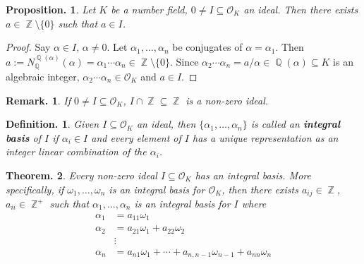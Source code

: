 \documentclass[11pt, a4paper]{memoir}
\DeclareMathOperator{\Q}{{\mathbb{Q}}}
\DeclareMathOperator{\Z}{{\mathbb{Z}}}
\theoremstyle{change}
\newtheorem{theorem}{Theorem.}[section]
\newtheorem{proposition}[theorem]{Proposition.}
\theoremstyle{plain}
\theoremstyle{nonumberplain}
\newtheorem{definition}{Definition.}
\newtheorem{remark}{Remark.}
\newtheorem{proof}{Proof}
\numberwithin{equation}{section}
\begin{document}
\begin{proposition}
    Let $K$ be a number field, $0\neq I\subseteq\mathcal{O}_K$ an ideal.
    Then there exists $a\in\Z\setminus\{0\}$ such that $a\in I$.
\end{proposition}
\begin{proof}
    Say $\alpha\in I$, $\alpha\neq 0$.
    Let $\alpha_1,\ldots,\alpha_n$ be conjugates of $\alpha=\alpha_1$.
    Then $a:=N_{\Q}^{\Q(\alpha)}(\alpha)=\alpha_1\cdots\alpha_n\in\Z\setminus\{0\}$.
    Since $\alpha_2\cdots\alpha_n=a/\alpha\in\Q(\alpha)\subseteq K$ is an algebraic integer, $\alpha_2\cdots\alpha_n\in\mathcal{O}_K$ and $a\in I$.
\end{proof}
\begin{remark}
    If $0\neq I\subseteq\mathcal{O}_K$, $I\cap\Z\subseteq\Z$ is a non-zero ideal.
\end{remark}
\begin{definition}
    Given $I\subseteq\mathcal{O}_K$ an ideal, then $\{\alpha_1,\ldots,\alpha_n\}$ is called an \textbf{integral basis} of $I$ if $\alpha_i\in I$ and every element of $I$ has a unique representation as an integer linear combination of the $\alpha_i$.
\end{definition}
\begin{theorem}
    Every non-zero ideal $I\subseteq\mathcal{O}_K$ has an integral basis.
    More specifically, if $\omega_1,\ldots,\omega_n$ is an integral basis for $\mathcal{O}_K$, then there exists $a_{ij}\in\Z$, $a_{ii}\in\Z^+$ such that $\alpha_1,\ldots,\alpha_n$ is an integral basis for $I$ where
    \begin{align*}
        \alpha_1 &= a_{11}\omega_1\\
        \alpha_2 &= a_{21}\omega_1+a_{22}\omega_2\\
                 &\vdots\\
        \alpha_n &= a_{n1}\omega_1+\cdots+a_{n,n-1}\omega_{n-1}+a_{nn}\omega_n
    \end{align*}
\end{theorem}
\end{document}
